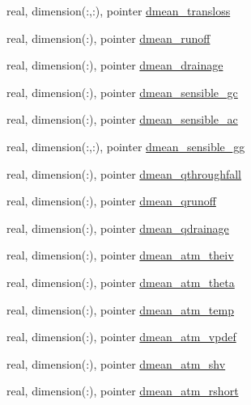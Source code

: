 \begin{DoxyCompactItemize}
\item 
real, dimension(\+:,\+:), pointer \hyperlink{structed__state__vars_1_1edtype_ae95e37b024df4c3eae0eb5ab2e4510ca}{dmean\+\_\+transloss}
\item 
real, dimension(\+:), pointer \hyperlink{structed__state__vars_1_1edtype_a4d1e10a2b1467a60bfd488857079fe3c}{dmean\+\_\+runoff}
\item 
real, dimension(\+:), pointer \hyperlink{structed__state__vars_1_1edtype_ab63074ed054a8bcb66ed49f7d88ca7c7}{dmean\+\_\+drainage}
\item 
real, dimension(\+:), pointer \hyperlink{structed__state__vars_1_1edtype_a988cef5dc5f9910e9b10775c2134e908}{dmean\+\_\+sensible\+\_\+gc}
\item 
real, dimension(\+:), pointer \hyperlink{structed__state__vars_1_1edtype_a2d7575d955dee4f604f59a82a8585c00}{dmean\+\_\+sensible\+\_\+ac}
\item 
real, dimension(\+:,\+:), pointer \hyperlink{structed__state__vars_1_1edtype_a36317deaeae17b6d5b9d91eea955ffe2}{dmean\+\_\+sensible\+\_\+gg}
\item 
real, dimension(\+:), pointer \hyperlink{structed__state__vars_1_1edtype_ae11fd4df79053e8164ca17d093b3c7fd}{dmean\+\_\+qthroughfall}
\item 
real, dimension(\+:), pointer \hyperlink{structed__state__vars_1_1edtype_a63d87c15f4d679af2a94ec6b5b300ede}{dmean\+\_\+qrunoff}
\item 
real, dimension(\+:), pointer \hyperlink{structed__state__vars_1_1edtype_a841a63323081ad0c5e4b120fca9c4fc3}{dmean\+\_\+qdrainage}
\item 
real, dimension(\+:), pointer \hyperlink{structed__state__vars_1_1edtype_acfa70ef04f74dd2a45d8f694c8927a49}{dmean\+\_\+atm\+\_\+theiv}
\item 
real, dimension(\+:), pointer \hyperlink{structed__state__vars_1_1edtype_a6a559aeb68995471047a53ee29c6c8b1}{dmean\+\_\+atm\+\_\+theta}
\item 
real, dimension(\+:), pointer \hyperlink{structed__state__vars_1_1edtype_a98f9fe23b0c77b2d16219a7111c5300e}{dmean\+\_\+atm\+\_\+temp}
\item 
real, dimension(\+:), pointer \hyperlink{structed__state__vars_1_1edtype_a37fe9306920998443b54ea587a60216b}{dmean\+\_\+atm\+\_\+vpdef}
\item 
real, dimension(\+:), pointer \hyperlink{structed__state__vars_1_1edtype_a22e13031183bbde0b71d267f431e9540}{dmean\+\_\+atm\+\_\+shv}
\item 
real, dimension(\+:), pointer \hyperlink{structed__state__vars_1_1edtype_afebee007c4e8c0c78df981c1ea78099a}{dmean\+\_\+atm\+\_\+rshort}

\end{DoxyCompactItemize}
